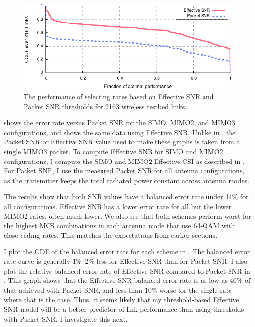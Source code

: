 \begin{figure}[htbp]
  \centering
  \includegraphics[width=\textwidth]{figures/delivery/goodbad/selection_performance.pdf}
  \caption[Performance from selecting rates with Effective SNR and Packet SNR]{The performance of selecting rates based on Effective SNR and Packet SNR thresholds for 2163 wireless testbed links.}
  \label{fig:selection_performance}
\end{figure}


 shows the error rate versus Packet SNR for the SIMO, MIMO2, and MIMO3 configurations, and  shows the same data using Effective SNR. Unlike in , the Packet SNR or Effective SNR value used to make these graphs is taken from a single MIMO3 packet. To compute Effective SNR for SIMO and MIMO2 configurations, I compute the SIMO and MIMO2 Effective CSI as described in . For Packet SNR, I use the measured Packet SNR for all antenna configurations, as the transmitter keeps the total radiated power constant across antenna modes.

The results show that both SNR values have a balanced error rate under 14\% for all configurations. Effective SNR has a lower error rate for all but the lower MIMO2 rates, often much lower. We also see that both schemes perform worst for the highest MCS combinations in each antenna mode that use 64-QAM with close coding rates. This matches the expectations from earlier sections.

I plot the CDF of the balanced error rate for each scheme in . The balanced error rate curve is generally 1\%--2\% less for Effective SNR than for Packet SNR. I also plot the relative balanced error rate of Effective SNR compared to Packet SNR in . This graph shows that the Effective SNR balanced error rate is as low as 40\% of that achieved with Packet SNR, and less than 10\% worse for the single rate where that is the case. Thus, it seems likely that my threshold-based Effective SNR model will be a better predictor of link performance than using thresholds with Packet SNR. I investigate this next.


